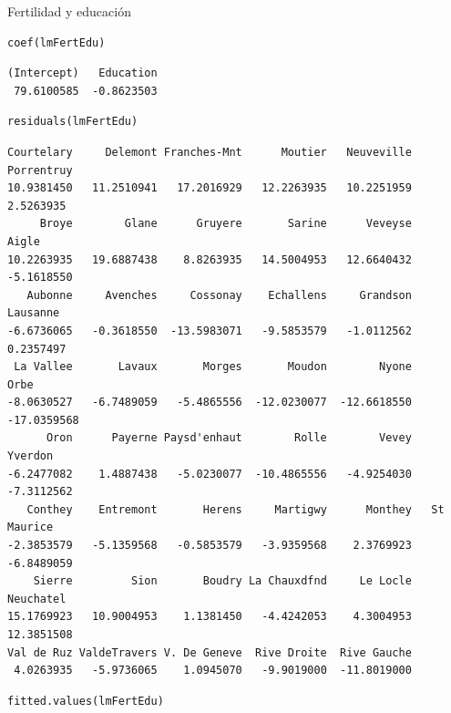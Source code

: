 \documentclass[xcolor={usenames,svgnames,dvipsnames}]{beamer}
\begin{document}
\begin{frame}[fragile,label=sec-3-2]{Fertilidad y educación}
 \lstset{language=R,numbers=none}
\begin{lstlisting}
coef(lmFertEdu)
\end{lstlisting}

\begin{verbatim}
(Intercept)   Education 
 79.6100585  -0.8623503
\end{verbatim}

\lstset{language=R,numbers=none}
\begin{lstlisting}
residuals(lmFertEdu)
\end{lstlisting}

\begin{verbatim}
Courtelary     Delemont Franches-Mnt      Moutier   Neuveville   Porrentruy 
10.9381450   11.2510941   17.2016929   12.2263935   10.2251959    2.5263935 
     Broye        Glane      Gruyere       Sarine      Veveyse        Aigle 
10.2263935   19.6887438    8.8263935   14.5004953   12.6640432   -5.1618550 
   Aubonne     Avenches     Cossonay    Echallens     Grandson     Lausanne 
-6.6736065   -0.3618550  -13.5983071   -9.5853579   -1.0112562    0.2357497 
 La Vallee       Lavaux       Morges       Moudon        Nyone         Orbe 
-8.0630527   -6.7489059   -5.4865556  -12.0230077  -12.6618550  -17.0359568 
      Oron      Payerne Paysd'enhaut        Rolle        Vevey      Yverdon 
-6.2477082    1.4887438   -5.0230077  -10.4865556   -4.9254030   -7.3112562 
   Conthey    Entremont       Herens     Martigwy      Monthey   St Maurice 
-2.3853579   -5.1359568   -0.5853579   -3.9359568    2.3769923   -6.8489059 
    Sierre         Sion       Boudry La Chauxdfnd     Le Locle    Neuchatel 
15.1769923   10.9004953    1.1381450   -4.4242053    4.3004953   12.3851508 
Val de Ruz ValdeTravers V. De Geneve  Rive Droite  Rive Gauche 
 4.0263935   -5.9736065    1.0945070   -9.9019000  -11.8019000
\end{verbatim}

\lstset{language=R,numbers=none}
\begin{lstlisting}
fitted.values(lmFertEdu)
\end{lstlisting}


\end{frame}
\end{document}
